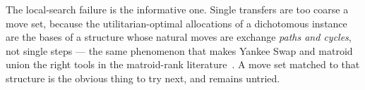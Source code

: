 The local-search failure is the informative one. Single transfers are too coarse
a move set, because the utilitarian-optimal allocations of a dichotomous
instance are the bases of a structure whose natural moves are exchange
\emph{paths and cycles}, not single steps --- the same phenomenon that makes
Yankee Swap and matroid union the right tools in the matroid-rank
literature~\cite{BEF21}. A move set matched to that structure is the obvious
thing to try next, and remains untried.
